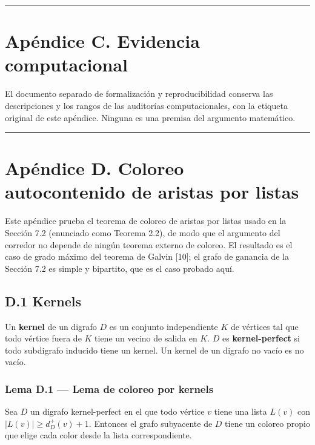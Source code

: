 \documentclass[spanish,11pt,a4paper]{article}
\begin{document}
\begin{center}\rule{0.5\linewidth}{0.5pt}\end{center}

\section{Apéndice C. Evidencia
computacional}\label{apuxe9ndice-c.-evidencia-computacional}

El documento separado de formalización y reproducibilidad conserva las
descripciones y los rangos de las auditorías computacionales, con la
etiqueta original de este apéndice. Ninguna es una premisa del argumento
matemático.

\begin{center}\rule{0.5\linewidth}{0.5pt}\end{center}

\section{Apéndice D. Coloreo autocontenido de aristas por
listas}\label{apuxe9ndice-d.-coloreo-autocontenido-de-aristas-por-listas}

Este apéndice prueba el teorema de coloreo de aristas por listas usado
en la Sección 7.2 (enunciado como Teorema 2.2), de modo que el argumento
del corredor no depende de ningún teorema externo de coloreo. El
resultado es el caso de grado máximo del teorema de Galvin {[}10{]}; el
grafo de ganancia de la Sección 7.2 es simple y bipartito, que es el
caso probado aquí.

\subsection{D.1 Kernels}\label{d.1-kernels}

Un \textbf{kernel} de un digrafo \(D\) es un conjunto independiente
\(K\) de vértices tal que todo vértice fuera de \(K\) tiene un vecino de
salida en \(K\). \(D\) es \textbf{kernel-perfect} si todo subdigrafo
inducido tiene un kernel. Un kernel de un digrafo no vacío es no vacío.

\subsubsection{Lema D.1 --- Lema de coloreo por
kernels}\label{lema-d.1-lema-de-coloreo-por-kernels}

Sea \(D\) un digrafo kernel-perfect en el que todo vértice \(v\) tiene
una lista \(L(v)\) con \(|L(v)|\ge d^+_D(v)+1\). Entonces el grafo
subyacente de \(D\) tiene un coloreo propio que elige cada color desde
la lista correspondiente.
\end{document}
